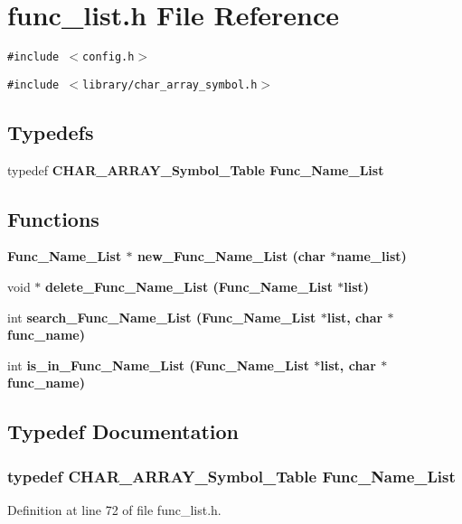 \section{func\_\-list.h File Reference}
\label{func__list_8h}
{\tt \#include $<$config.h$>$}\par
{\tt \#include $<$library/char\_\-array\_\-symbol.h$>$}\par
\subsection*{Typedefs}
\begin{CompactItemize}
\item 
typedef \bf{CHAR\_\-ARRAY\_\-Symbol\_\-Table} \bf{Func\_\-Name\_\-List}
\end{CompactItemize}
\subsection*{Functions}
\begin{CompactItemize}
\item 
\bf{Func\_\-Name\_\-List} $\ast$ \bf{new\_\-Func\_\-Name\_\-List} (char $\ast$name\_\-list)
\item 
void $\ast$ \bf{delete\_\-Func\_\-Name\_\-List} (\bf{Func\_\-Name\_\-List} $\ast$\bf{list})
\item 
int \bf{search\_\-Func\_\-Name\_\-List} (\bf{Func\_\-Name\_\-List} $\ast$\bf{list}, char $\ast$func\_\-name)
\item 
int \bf{is\_\-in\_\-Func\_\-Name\_\-List} (\bf{Func\_\-Name\_\-List} $\ast$\bf{list}, char $\ast$func\_\-name)
\end{CompactItemize}


\subsection{Typedef Documentation}
\subsubsection{\setlength{\rightskip}{0pt plus 5cm}typedef \bf{CHAR\_\-ARRAY\_\-Symbol\_\-Table} \bf{Func\_\-Name\_\-List}}\label{func__list_8h_eeabe1585186cdfe3f79815192717214}




Definition at line 72 of file func\_\-list.h.

